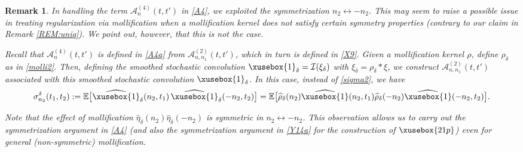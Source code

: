 \documentclass[%
11pt,  reqno]{amsart}
\def\<#1>{\xusebox{#1}}
\newtheorem{remark}[theorem]{Remark}
\newcommand{\1}{\hspace{0.2mm}\text{I}\hspace{0.2mm}}
\newcommand{\noi}{\noindent}
\newcommand{\E}{\mathbb{E}}
\newcommand{\dl}{\delta}
\newcommand{\s}{\sigma}
\newcommand{\ft}{\widehat}
\newcommand{\I}{\mathcal{I}}
\newcommand{\A}{\mathcal{A}}
\numberwithin{equation}{section}
\numberwithin{theorem}{section}
\begin{document}
\begin{remark}\label{REM:sym}
\rm
In handling the term 
$\A^{(4)}_{n} (t, t')$ in \eqref{A4}, 
we exploited the symmetrization  $n_2 \leftrightarrow -n_2$.
This may seem to raise a possible issue in 
treating regularization via  mollification
when a mollification kernel does not satisfy certain symmetry properties
(contrary to our claim in Remark \ref{REM:uniq}).
We point out, however, that this is not the case.

Recall that 
$\A^{(4)}_{n} (t, t')$
is defined in \eqref{A4a}
from 
$ \A^{(2)}_{n, n_1} (t, t')$,
which in turn is defined  in \eqref{X9}.  
Given a mollification kernel $\rho$, 
define $\rho_\dl$ as in \eqref{molli2}.
Then, defining the smoothed stochastic 
convolution $\<1>_\dl = \I(\xi_\dl)$
with $\xi_\dl = \rho_\dl * \xi$, 
we construct 
$ \A^{(2)}_{n, n_1} (t, t')$ associated
with this smoothed stochastic convolution 
$\<1>_\dl$.
In this case, instead of  \eqref{sigma2}, 
we have
\[\s_{n_2}^\dl(t_1, t_2 ) 
: = \E  \big[  \ft{\<1>}_\dl(n_2, t_1)  \,  \ft{\<1>}_\dl(-n_2, t_2) \big]
= \E  \big[  \ft \rho_{\dl}(n_2) \ft{\<1>}(n_2, t_1)  
\ft \rho_{\dl}(-n_2)
  \ft{\<1>}(-n_2, t_2) \big].
\]

\noi
Note that the effect of mollification 
$ \ft \eta_{\dl}(n_2)
\ft \eta_{\dl}(-n_2)$
is symmetric in  $n_2 \leftrightarrow -n_2$.
This observation allows us to carry out the symmetrization argument
in \eqref{A4} 
(and also the 
 symmetrization argument
in \eqref{Y14a} for the construction of 
$\<21p>$)
even for general (non-symmetric) mollification.

\end{remark}
\end{document}
